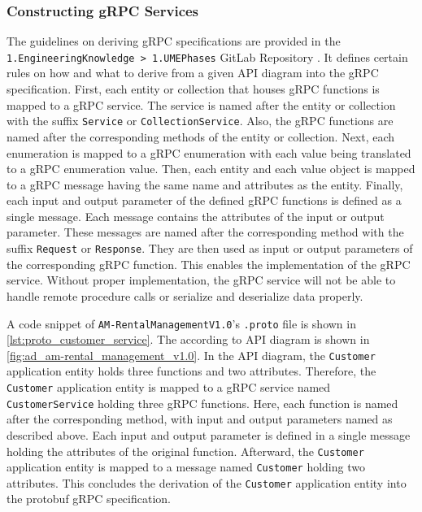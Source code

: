 \subsubsection*{Constructing gRPC Services}
The guidelines on deriving gRPC specifications are provided in the \hfill \linebreak \texttt{1.EngineeringKnowledge > 1.UMEPhases} GitLab Repository \cite{CM-G-RPC}.
It defines certain rules on how and what to derive from a given API diagram into the gRPC specification.
First, each entity or collection that houses gRPC functions is mapped to a gRPC service.
The service is named after the entity or collection with the suffix \texttt{Service} or \texttt{CollectionService}.
Also, the gRPC functions are named after the corresponding methods of the entity or collection.
Next, each enumeration is mapped to a gRPC enumeration with each value being translated to a gRPC enumeration value.
Then, each entity and each value object is mapped to a gRPC message having the same name and attributes as the entity.
Finally, each input and output parameter of the defined gRPC functions is defined as a single message.
Each message contains the attributes of the input or output parameter.
These messages are named after the corresponding method with the suffix \texttt{Request} or \texttt{Response}.
They are then used as input or output parameters of the corresponding gRPC function.
This enables the implementation of the gRPC service.
Without proper implementation, the gRPC service will not be able to handle remote procedure calls or serialize and deserialize data properly.

A code snippet of \texttt{AM-RentalManagementV1.0}'s \texttt{.proto} file is shown in \autoref{lst:proto_customer_service}.
The according to API diagram is shown in \autoref{fig:ad_am-rental_management_v1.0}.
In the API diagram, the \texttt{Customer} application entity holds three functions and two attributes.
Therefore, the \texttt{Customer} application entity is mapped to a gRPC service named \texttt{CustomerService} holding three gRPC functions.
Here, each function is named after the corresponding method, with input and output parameters named as described above.
Each input and output parameter is defined in a single message holding the attributes of the original function.
Afterward, the \texttt{Customer} application entity is mapped to a message named \texttt{Customer} holding two attributes.
This concludes the derivation of the \texttt{Customer} application entity into the protobuf gRPC specification.

